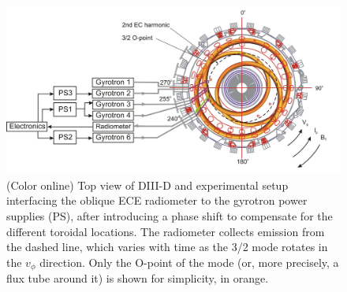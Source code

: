 \documentclass[aps,pra,twocolumn]{revtex4}
\begin{document}
\clearpage
\begin{widetext}
\begin{center}
  \begin{figure}[t]
       \includegraphics[scale=0.9]{fig1.jpg}  %
       \caption{\label{FigTopView} (Color online) 
       Top view of DIII-D and experimental setup interfacing 
       the oblique ECE radiometer to the gyrotron power supplies (PS), after 
       introducing a phase shift to compensate for the different toroidal 
       locations. 
       The radiometer collects emission from the dashed line, which varies 
       with time as the 3/2 mode rotates in the $v_\phi$ direction. 
       Only the O-point of the mode (or, more precisely, a flux tube around it) 
       is shown for simplicity, in orange.}
  \end{figure}
\end{center}



\end{widetext}
\end{document}
